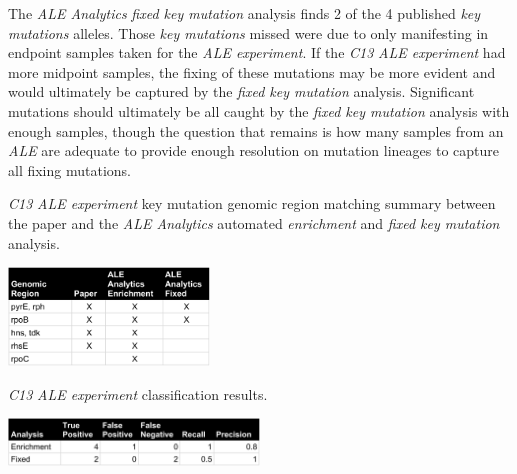 \documentclass[12pt,final,masters,chapterheads]{ucsd}  %
\newcommand\todo[1]{\textcolor{red}{#1}}
\begin{document}
The \textit{ALE Analytics} \textit{fixed key mutation} analysis finds 2 of the 4 published \textit{key mutations} alleles. Those \textit{key mutations} missed were due to only manifesting in endpoint samples taken for the \textit{ALE experiment}. If the \textit{C13} \textit{ALE experiment} had more midpoint samples, the fixing of these mutations may be more evident and would ultimately be captured by the \textit{fixed key mutation} analysis. Significant mutations should ultimately be all caught by the \textit{fixed key mutation} analysis with enough samples, though the question that remains is how many samples from an \textit{ALE} are adequate to provide enough resolution on mutation lineages to capture all fixing mutations.
\begin{table}[H]
  \caption{\textit{C13} \textit{ALE experiment} {key mutation} genomic region matching summary between the paper and the \textit{ALE Analytics} automated \textit{enrichment} and \textit{fixed key mutation} analysis.}
  \centering
  \includegraphics[width=0.4\textwidth]{c13_key_mutation_regions.png}
\end{table}
\begin{table}[H]
  \caption{\textit{C13} \textit{ALE experiment} classification results.}
  \centering
  \includegraphics[width=0.5\textwidth]{c13_precision_recall.png}
\end{table}
\end{document}
